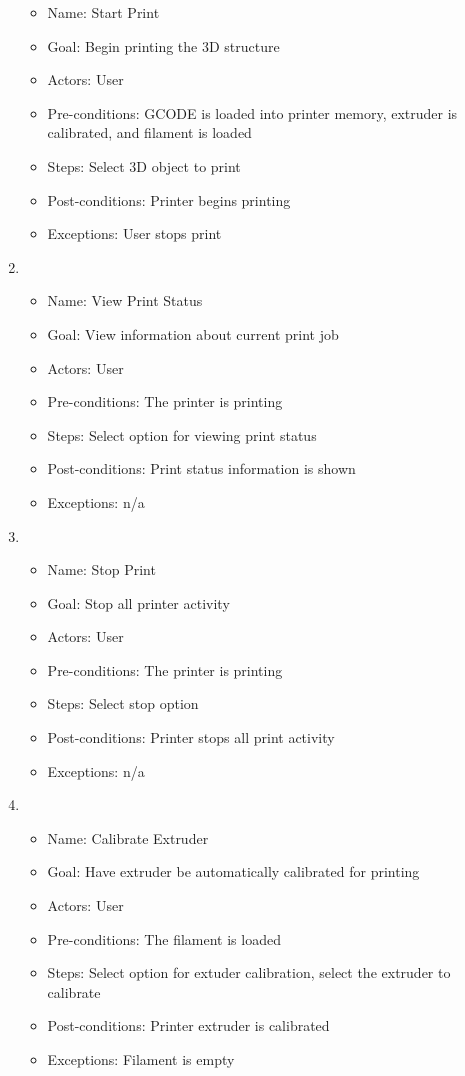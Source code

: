 \begin{enumerate}
	\begin{itemize}
	\item Name: Start Print
	\item Goal: Begin printing the 3D structure 
	\item Actors: User
	\item Pre-conditions: GCODE is loaded into printer memory, extruder is calibrated, and filament is loaded
	\item Steps: Select 3D object to print
	\item Post-conditions: Printer begins printing
	\item Exceptions: User stops print
	\end{itemize}
	\item 
	\begin{itemize}
	\item Name: View Print Status
	\item Goal: View information about current print job
	\item Actors: User
	\item Pre-conditions: The printer is printing
	\item Steps: Select option for viewing print status
	\item Post-conditions: Print status information is shown
	\item Exceptions: n/a
	\end{itemize}
	\item 
	\begin{itemize}
	\item Name: Stop Print
	\item Goal: Stop all printer activity
	\item Actors: User
	\item Pre-conditions: The printer is printing
	\item Steps: Select stop option
	\item Post-conditions: Printer stops all print activity
	\item Exceptions: n/a
	\end{itemize}
	\item 
	\begin{itemize}
	\item Name: Calibrate Extruder
	\item Goal: Have extruder be automatically calibrated for printing
	\item Actors: User
	\item Pre-conditions: The filament is loaded
	\item Steps: Select option for extuder calibration, select the extruder to calibrate
	\item Post-conditions: Printer extruder is calibrated
	\item Exceptions: Filament is empty
	\end{itemize}
\end{enumerate}
